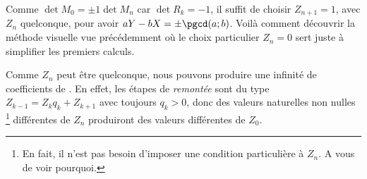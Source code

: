  
 \medskip
 
 
Comme $\det M_0 = \pm 1 \det M_n$ car $\det R_k = -1$, il suffit de choisir $Z_{n+1} = 1$, avec $Z_n$ quelconque, pour avoir $aY - bX = \pm \pgcd(a ; b)$. Voilà comment découvrir la méthode visuelle vue précédemment où le choix particulier $Z_n = 0$ sert juste à simplifier les premiers calculs.


\begin{remark}
	Comme $Z_n$ peut être quelconque, nous pouvons produire une infinité de coefficients de \bb. En effet, les étapes de \emph{\og remontée \fg} sont du type $Z_{k-1} = Z_k q_k + Z_{k+1}$ avec toujours $q_k > 0$, donc des valeurs naturelles non nulles
	\footnote{
		En fait, il n'est pas besoin d'imposer une condition particulière à $Z_n$. A vous de voir pourquoi.
	}
	différentes de $Z_n$ produiront des valeurs différentes de $Z_0$.
\end{remark}
